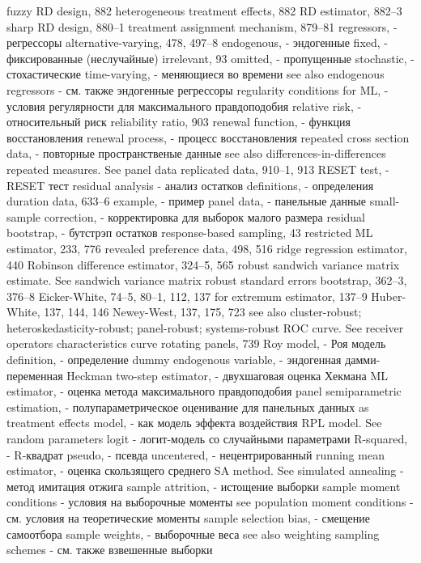 fuzzy RD design, 882
heterogeneous treatment effects, 882
RD estimator, 882–3
sharp RD design, 880–1
treatment assignment mechanism, 879–81
regressors, - регрессоры
alternative-varying, 478, 497–8 
endogenous, - эндогенные
fixed, - фиксированные (неслучайные)
irrelevant, 93
omitted, - пропущенные
stochastic, - стохастические
time-varying, - меняющиеся во времени
see also endogenous regressors - см. также эндогенные регрессоры
regularity conditions for ML, - условия регулярности для максимального правдоподобия
relative risk, - относительный риск
reliability ratio, 903
renewal function, - функция восстановления
renewal process, - процесс восстановления
repeated cross section data, - повторные пространственые данные
see also differences-in-differences repeated measures. See panel data replicated data, 910–1, 913
RESET test, - RESET тест
residual analysis - анализ остатков
definitions, - определения
duration data, 633–6 
example, - пример
panel data, - панельные данные
small-sample correction, - корректировка для выборок малого размера
residual bootstrap, - бутстрэп остатков
response-based sampling, 43
restricted ML estimator, 233, 776
revealed preference data, 498, 516
ridge regression estimator, 440
Robinson difference estimator, 324–5, 565 robust sandwich variance matrix estimate. See
sandwich variance matrix robust standard errors
bootstrap, 362–3, 376–8
Eicker-White, 74–5, 80–1, 112, 137
for extremum estimator, 137–9
Huber-White, 137, 144, 146
Newey-West, 137, 175, 723
see also cluster-robust; heteroskedasticity-robust;
panel-robust; systems-robust
ROC curve. See receiver operators characteristics
curve
rotating panels, 739
Roy model, - Роя модель
definition, - определение
dummy endogenous variable, - эндогенная дамми-переменная
Heckman two-step estimator, - двухшаговая оценка Хекмана
ML estimator, - оценка метода максимального правдоподобия
panel semiparametric estimation, - полупараметрическое оценивание для панельных данных
as treatment effects model, - как модель эффекта воздействия
RPL model. See random parameters logit - логит-модель со случайными параметрами
R-squared, - R-квадрат
pseudo, - псевда
uncentered, - нецентрированный
running mean estimator, - оценка скользящего среднего
SA method. See simulated annealing - метод имитация отжига 
sample attrition, - истощение выборки
sample moment conditions - условия на выборочные моменты
see population moment conditions - см. условия на теоретические моменты
sample selection bias, - смещение самоотбора
sample weights, - выборочные веса
see also weighting sampling schemes - см. также взвешенные выборки
